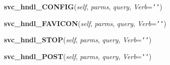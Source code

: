     \vspace{0.5ex}

\hspace{.8\funcindent}\begin{boxedminipage}{\funcwidth}

    \raggedright \textbf{svc\_hndl\_CONFIG}(\textit{self}, \textit{parms}, \textit{query}, \textit{Verb}={\tt \texttt{'}\texttt{}\texttt{'}})

\setlength{\parskip}{2ex}
\setlength{\parskip}{1ex}
    \end{boxedminipage}

    \label{Proxy:Proxy:svc_hndl_FAVICON}

    \vspace{0.5ex}

\hspace{.8\funcindent}\begin{boxedminipage}{\funcwidth}

    \raggedright \textbf{svc\_hndl\_FAVICON}(\textit{self}, \textit{parms}, \textit{query}, \textit{Verb}={\tt \texttt{'}\texttt{}\texttt{'}})

\setlength{\parskip}{2ex}
\setlength{\parskip}{1ex}
    \end{boxedminipage}

    \label{Proxy:Proxy:svc_hndl_STOP}

    \vspace{0.5ex}

\hspace{.8\funcindent}\begin{boxedminipage}{\funcwidth}

    \raggedright \textbf{svc\_hndl\_STOP}(\textit{self}, \textit{parms}, \textit{query}, \textit{Verb}={\tt \texttt{'}\texttt{}\texttt{'}})

\setlength{\parskip}{2ex}
\setlength{\parskip}{1ex}
    \end{boxedminipage}

    \label{Proxy:Proxy:svc_hndl_POST}

    \vspace{0.5ex}

\hspace{.8\funcindent}\begin{boxedminipage}{\funcwidth}

    \raggedright \textbf{svc\_hndl\_POST}(\textit{self}, \textit{parms}, \textit{query}, \textit{Verb}={\tt \texttt{'}\texttt{}\texttt{'}})

\setlength{\parskip}{2ex}
\setlength{\parskip}{1ex}
    \end{boxedminipage}

